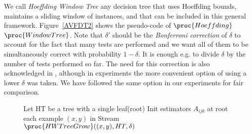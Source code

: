 We call {\em Hoeffding Window Tree} any decision tree 
that uses Hoeffding bounds, maintains a sliding window of instances, 
and that can be included in this general framework.
Figure~\ref{AVFDT2} shows the pseudo-code of $\proc{Hoeffding}$ $\proc{Window Tree}$.
Note that $\delta'$ should be the {\em Bonferroni correction} of $\delta$ to account 
for the fact that many tests are performed and we want all of them to be simultaneously
correct with probability $1-\delta$. It is enough e.g. to divide $\delta$ by the number
of tests performed so far. The need for this correction is also acknowledged 
in \cite{vfdt}, although in experiments the more convenient option of
using a lower $\delta$ was taken. We have followed the same option in our experiments
for fair comparison.


\begin{figure}%
\begin{codebox}
\li  Let HT be a tree with a single leaf(root) 
\li  Init estimators $A_{ijk}$ at root
\li \For each example $(x,y)$ in Stream 
\li \Do $\proc{\hwt Grow} ((x,y),HT, \delta)$
\End  \End
\end{codebox}


\end{figure}
